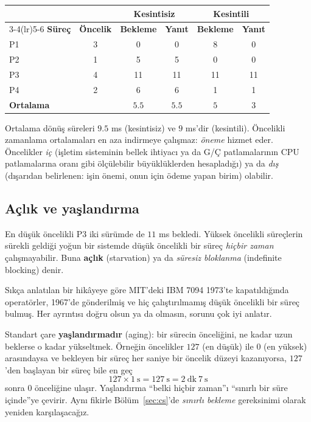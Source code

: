 \documentclass[11pt,a4paper]{article}
\newcommand{\term}[1]{\textbf{\color{mintdeep}#1}}
\begin{document}
\begin{center}
\renewcommand{\arraystretch}{1.2}
\begin{tabular}{@{}lccccc@{}}
\toprule
& & \multicolumn{2}{c}{\textbf{Kesintisiz}} & \multicolumn{2}{c}{\textbf{Kesintili}}\\
\cmidrule(lr){3-4}\cmidrule(lr){5-6}
\textbf{Süreç} & \textbf{Öncelik} & \textbf{Bekleme} & \textbf{Yanıt} & \textbf{Bekleme} & \textbf{Yanıt}\\
\midrule
P1 & 3 & 0 & 0 & 8 & 0\\
P2 & 1 & 5 & 5 & 0 & 0\\
P3 & 4 & 11 & 11 & 11 & 11\\
P4 & 2 & 6 & 6 & 1 & 1\\
\midrule
\textbf{Ortalama} & & $5.5$ & $5.5$ & $5$ & $3$\\
\bottomrule
\end{tabular}
\end{center}

Ortalama dönüş süreleri $9.5$ ms (kesintisiz) ve $9$ ms'dir (kesintili). Öncelikli zamanlama ortalamaları en aza indirmeye çalışmaz: \emph{öneme} hizmet eder. Öncelikler \emph{iç} (işletim sisteminin bellek ihtiyacı ya da G/Ç patlamalarının CPU patlamalarına oranı gibi ölçülebilir büyüklüklerden hesapladığı) ya da \emph{dış} (dışarıdan belirlenen: işin önemi, onun için ödeme yapan birim) olabilir.

\subsection{Açlık ve yaşlandırma}

En düşük öncelikli P3 iki sürümde de $11$ ms bekledi. Yüksek öncelikli süreçlerin sürekli geldiği yoğun bir sistemde düşük öncelikli bir süreç \emph{hiçbir zaman} çalışmayabilir. Buna \term{açlık} (starvation) ya da \emph{süresiz bloklanma} (indefinite blocking) denir.

\begin{histnote}
Sıkça anlatılan bir hikâyeye göre MIT'deki IBM 7094 1973'te kapatıldığında operatörler, 1967'de gönderilmiş ve hiç çalıştırılmamış düşük öncelikli bir süreç bulmuş. Her ayrıntısı doğru olsun ya da olmasın, sorunu çok iyi anlatır.
\end{histnote}

Standart çare \term{yaşlandırmadır} (aging): bir sürecin önceliğini, ne kadar uzun beklerse o kadar yükseltmek. Örneğin öncelikler $127$ (en düşük) ile $0$ (en yüksek) arasındaysa ve bekleyen bir süreç her saniye bir öncelik düzeyi kazanıyorsa, $127$'den başlayan bir süreç bile en geç
\[
127 \times 1\ \text{s} = 127\ \text{s} = 2\ \text{dk}\ 7\ \text{s}
\]
sonra $0$ önceliğine ulaşır. Yaşlandırma ``belki hiçbir zaman''ı ``sınırlı bir süre içinde''ye çevirir. Aynı fikirle Bölüm~\ref{sec:cs}'de \emph{sınırlı bekleme} gereksinimi olarak yeniden karşılaşacağız.
\end{document}
